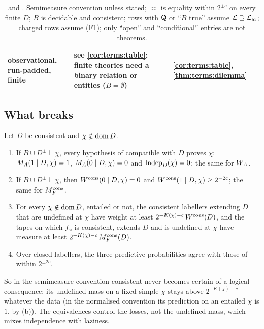 \begin{table}[t]
\begin{tabularx}{\textwidth}{@{}>{\raggedright\arraybackslash}p{}>{\raggedright\arraybackslash}X>{\raggedright\arraybackslash}p{}@{}}
observational, run-padded, finite & see \cref{cor:terms:table}; finite theories need a binary relation or entities ($B=\emptyset$) & \cref{cor:terms:table}, \cref{thm:terms:dilemma}\\
\bottomrule
\end{tabularx}
\caption{\SAIabbr and \SOIabbr. Semimeasure convention unless stated; $\asymp$ is equality within $2^{\pm c}$ on every finite $D$; $B$ is decidable and consistent; rows with $\mathsf{Q}$ or ``$B$ true'' assume $\mathcal L\supseteq\mathcal{L}_{\mathrm{ar}}$; charged rows assume (F1); only ``open'' and ``conditional'' entries are not theorems.}\label{tab:soi}
\end{table}

\subsection{What breaks}\label{sec:soi:breaks}

\begin{proposition}\label{prop:soi:closure}
Let $D$ be consistent and $\chi\notin\operatorname{dom} D$.
\begin{enumerate}[label=(\alph*),leftmargin=*]
\item If $B\cup D^\pm\vdash\chi$, every hypothesis of \SAIabbr compatible with $D$ proves $\chi$: $M_{A}(1\mid D,\chi)=1$, $M_{A}(0\mid D,\chi)=0$ and $\mathrm{Indep}_D(\chi)=0$; the same for $W_{A}$.
\item If $B\cup D^\pm\vdash\chi$, then $W^{\mathrm{cons}}(0\mid D,\chi)=0$ and $W^{\mathrm{cons}}(1\mid D,\chi)\ge2^{-2c}$; the same for $M_{F}^{\mathrm{cons}}$.
\item For every $\chi\notin\operatorname{dom} D$, entailed or not, the consistent labellers extending $D$ that are undefined at $\chi$ have weight at least $2^{-K(\chi)-c}\,W^{\mathrm{cons}}(D)$, and the tapes on which $f_\omega$ is consistent, extends $D$ and is undefined at $\chi$ have measure at least $2^{-K(\chi)-c}\,M_{F}^{\mathrm{cons}}(D)$.
\item Over closed labellers, the three predictive probabilities agree with those of \SAIabbr within $2^{\pm2c}$.
\end{enumerate}
\end{proposition}

So in the semimeasure convention consistent \SOIabbr never becomes certain of a logical consequence: its undefined mass on a fixed simple $\chi$ stays above $2^{-K(\chi)-c}$ whatever the data (in the normalised convention its prediction on an entailed $\chi$ is $1$, by (b)). The equivalences control the losses, not the undefined mass, which mixes independence with laziness.

